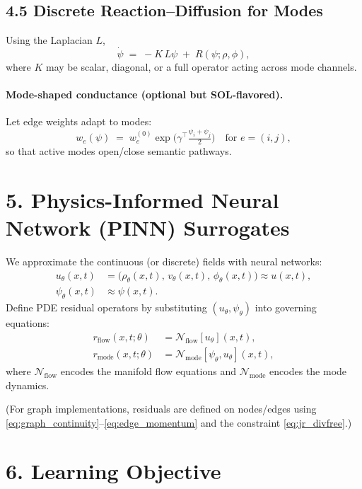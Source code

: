 \documentclass[11pt]{article}
\begin{document}
\subsection*{4.5 Discrete Reaction--Diffusion for Modes}
Using the Laplacian $L$,
\begin{equation}
\dot{\psi} \;=\; -K\,L\psi \;+\; R(\psi;\rho,\phi),
\end{equation}
where $K$ may be scalar, diagonal, or a full operator acting across mode channels.

\paragraph{Mode-shaped conductance (optional but SOL-flavored).}
Let edge weights adapt to modes:
\begin{equation}
w_e(\psi)\;=\;w_e^{(0)}\exp\!\Big(\gamma^\top \tfrac{\psi_i+\psi_j}{2}\Big)\quad \text{for }e=(i,j),
\end{equation}
so that active modes open/close semantic pathways.

\section*{5. Physics-Informed Neural Network (PINN) Surrogates}

We approximate the continuous (or discrete) fields with neural networks:
\begin{align}
u_\theta(x,t)&=\big(\rho_\theta(x,t),\,v_\theta(x,t),\,\phi_\theta(x,t)\big)\approx u(x,t),\\
\psi_\theta(x,t)&\approx \psi(x,t).
\end{align}
Define PDE residual operators by substituting $(u_\theta,\psi_\theta)$ into governing equations:
\begin{align}
r_{\text{flow}}(x,t;\theta)&=\mathcal{N}_{\text{flow}}[u_\theta](x,t),\\
r_{\text{mode}}(x,t;\theta)&=\mathcal{N}_{\text{mode}}[\psi_\theta,u_\theta](x,t),
\end{align}
where $\mathcal{N}_{\text{flow}}$ encodes the manifold flow equations and $\mathcal{N}_{\text{mode}}$ encodes the mode dynamics.

(For graph implementations, residuals are defined on nodes/edges using \eqref{eq:graph_continuity}--\eqref{eq:edge_momentum} and the constraint \eqref{eq:jr_divfree}.)

\section*{6. Learning Objective}
\end{document}
